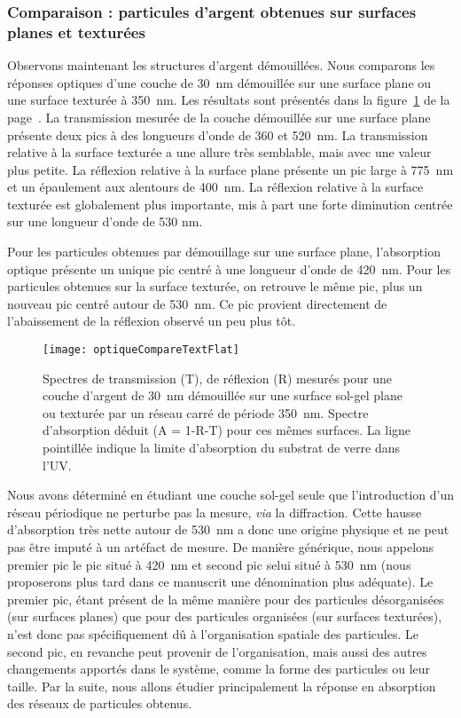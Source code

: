 	\subsubsection{Comparaison : particules d'argent obtenues sur surfaces planes et texturées}
Observons maintenant les structures d'argent démouillées. Nous comparons les réponses optiques d'une couche de 30~nm démouillée sur une surface plane ou une surface texturée à 350~nm. Les résultats sont présentés dans la figure~\ref{optiqueCompareTextFlat} de la page~\pageref{optiqueCompareTextFlat}. La transmission mesurée de la couche démouillée sur une surface plane présente deux pics à des longueurs d'onde de 360 et 520~nm. La transmission relative à la surface texturée a une allure très semblable, mais avec une valeur plus petite. La réflexion relative à la surface plane présente un pic large à 775~nm et un épaulement aux alentours de 400~nm. La réflexion relative à la surface texturée est globalement plus importante, mis à part une forte diminution centrée sur une longueur d'onde de 530 nm.\par 
Pour les particules obtenues par démouillage sur une surface plane, l'absorption optique présente un unique pic centré à une longueur d'onde de 420~nm. Pour les particules obtenues sur la surface texturée, on retrouve le même pic, plus un nouveau pic centré autour de 530~nm. Ce pic provient directement de l'abaissement de la réflexion observé un peu plus tôt.\par 

\begin{figure}[!p]
\centering
\texttt{[image: optiqueCompareTextFlat]}
\caption{Spectres de transmission (T), de réflexion (R) mesurés pour une couche d'argent de 30~nm démouillée sur une surface sol-gel plane ou texturée par un réseau carré de période 350~nm. Spectre d'absorption déduit (A = 1-R-T) pour ces mêmes surfaces. La ligne pointillée indique la limite d'absorption du substrat de verre dans l'UV.}
\label{optiqueCompareTextFlat}
\end{figure}
Nous avons déterminé en étudiant une couche sol-gel seule que l'introduction d'un réseau périodique ne perturbe pas la mesure, \textit{via} la diffraction. Cette hausse d'absorption très nette autour de 530~nm a donc une origine physique et ne peut pas être imputé à un artéfact de mesure. De manière générique, nous appelons \og premier pic \fg{} le pic situé à 420~nm et \og second pic \fg{} selui situé à 530~nm (nous proposerons plus tard dans ce manuscrit une dénomination plus adéquate). Le premier pic, étant présent de la même manière pour des particules désorganisées (sur surfaces planes) que pour des particules organisées (sur surfaces texturées), n'est donc pas spécifiquement dû à l'organisation spatiale des particules. Le second pic, en revanche peut provenir de l'organisation, mais aussi des autres changements apportés dans le système, comme la forme des particules ou leur taille. Par la suite, nous allons étudier principalement la réponse en absorption des réseaux de particules obtenus. \par 
   
